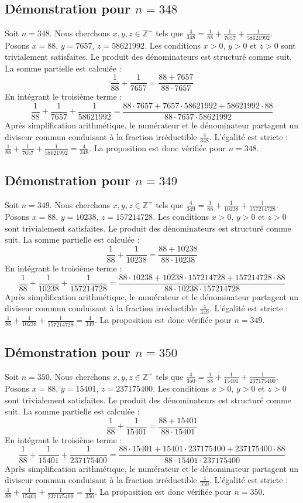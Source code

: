 \documentclass[11pt,a4paper]{article}
\begin{document}
\subsection{Démonstration pour $n = 348$}
Soit $n = 348$. Nous cherchons $x, y, z \in \mathbb{Z}^{+}$ tels que $\frac{4}{348} = \frac{1}{88} + \frac{1}{7657} + \frac{1}{58621992}$.
Posons $x = 88$, $y = 7657$, $z = 58621992$.
Les conditions $x > 0$, $y > 0$ et $z > 0$ sont trivialement satisfaites.
Le produit des dénominateurs est structuré comme suit. La somme partielle est calculée :
$$ \frac{1}{88} + \frac{1}{7657} = \frac{88+7657}{88 \cdot 7657} $$
En intégrant le troisième terme :
$$ \frac{1}{88} + \frac{1}{7657} + \frac{1}{58621992} = \frac{88 \cdot 7657 + 7657 \cdot 58621992 + 58621992 \cdot 88}{88 \cdot 7657 \cdot 58621992} $$
Après simplification arithmétique, le numérateur et le dénominateur partagent un diviseur commun conduisant à la fraction irréductible $\frac{4}{348}$.
L'égalité est stricte : $\frac{1}{88} + \frac{1}{7657} + \frac{1}{58621992} = \frac{4}{348}$.
La proposition est donc vérifiée pour $n = 348$.
\subsection{Démonstration pour $n = 349$}
Soit $n = 349$. Nous cherchons $x, y, z \in \mathbb{Z}^{+}$ tels que $\frac{4}{349} = \frac{1}{88} + \frac{1}{10238} + \frac{1}{157214728}$.
Posons $x = 88$, $y = 10238$, $z = 157214728$.
Les conditions $x > 0$, $y > 0$ et $z > 0$ sont trivialement satisfaites.
Le produit des dénominateurs est structuré comme suit. La somme partielle est calculée :
$$ \frac{1}{88} + \frac{1}{10238} = \frac{88+10238}{88 \cdot 10238} $$
En intégrant le troisième terme :
$$ \frac{1}{88} + \frac{1}{10238} + \frac{1}{157214728} = \frac{88 \cdot 10238 + 10238 \cdot 157214728 + 157214728 \cdot 88}{88 \cdot 10238 \cdot 157214728} $$
Après simplification arithmétique, le numérateur et le dénominateur partagent un diviseur commun conduisant à la fraction irréductible $\frac{4}{349}$.
L'égalité est stricte : $\frac{1}{88} + \frac{1}{10238} + \frac{1}{157214728} = \frac{4}{349}$.
La proposition est donc vérifiée pour $n = 349$.
\subsection{Démonstration pour $n = 350$}
Soit $n = 350$. Nous cherchons $x, y, z \in \mathbb{Z}^{+}$ tels que $\frac{4}{350} = \frac{1}{88} + \frac{1}{15401} + \frac{1}{237175400}$.
Posons $x = 88$, $y = 15401$, $z = 237175400$.
Les conditions $x > 0$, $y > 0$ et $z > 0$ sont trivialement satisfaites.
Le produit des dénominateurs est structuré comme suit. La somme partielle est calculée :
$$ \frac{1}{88} + \frac{1}{15401} = \frac{88+15401}{88 \cdot 15401} $$
En intégrant le troisième terme :
$$ \frac{1}{88} + \frac{1}{15401} + \frac{1}{237175400} = \frac{88 \cdot 15401 + 15401 \cdot 237175400 + 237175400 \cdot 88}{88 \cdot 15401 \cdot 237175400} $$
Après simplification arithmétique, le numérateur et le dénominateur partagent un diviseur commun conduisant à la fraction irréductible $\frac{4}{350}$.
L'égalité est stricte : $\frac{1}{88} + \frac{1}{15401} + \frac{1}{237175400} = \frac{4}{350}$.
La proposition est donc vérifiée pour $n = 350$.
\end{document}
